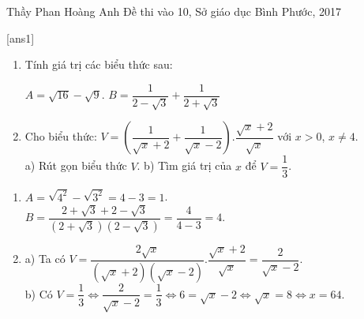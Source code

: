 \begin{name}
{Thầy  Phan Hoàng Anh}
{Đề thi vào 10, Sở giáo dục Bình Phước, 2017}
\end{name}
\setcounter{ex}{0}
[ans1]
\begin{ex}%
    \hfill
    \begin{enumerate}
        \item Tính giá trị các biểu thức sau:
        \begin{center}
        $A=\sqrt{16}-\sqrt{9}$.
        \hspace{5cm}
        $B=\dfrac{1}{2-\sqrt{3}}+\dfrac{1}{2+\sqrt{3}}$
	    \end{center}
        \item Cho biểu thức: $V=\left(\dfrac{1}{\sqrt{x}+2}+\dfrac{1}{\sqrt{x}-2}\right).\dfrac{\sqrt{x}+2}{\sqrt{x}}$ với $x>0$, $x\ne4$.\\
        a) Rút gọn biểu thức $V$.\hspace{3.5cm}
        b) Tìm giá trị của $x$ để $V=\dfrac{1}{3}$.
    \end{enumerate}
\loigiai
    {
    \begin{enumerate}
        \item $A=\sqrt{4^2}-\sqrt{3^2}=4-3=1$.\\
        $B=\dfrac{2+\sqrt{3}+2-\sqrt{3}}{(2+\sqrt{3})(2-\sqrt{3})}=\dfrac{4}{4-3}=4$.
        \item a) Ta có $V=\dfrac{2\sqrt{x}}{(\sqrt{x}+2)(\sqrt{x}-2)}.\dfrac{\sqrt{x}+2}{\sqrt{x}}=\dfrac{2}{\sqrt{x}-2}$.\\
        b) Có $V=\dfrac{1}{3}\Leftrightarrow\dfrac{2}{\sqrt{x}-2}=\dfrac{1}{3}\Leftrightarrow 6=\sqrt{x}-2\Leftrightarrow\sqrt{x}=8\Leftrightarrow x=64.$
    \end{enumerate}}
\end{ex}

